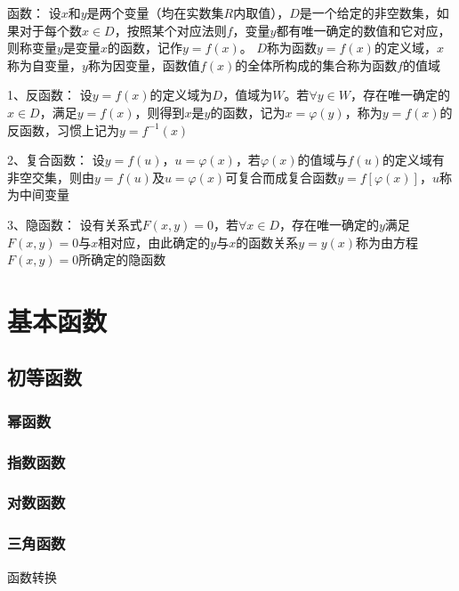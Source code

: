 \documentclass[12pt]{book}
\begin{document}
函数：
设$x$和$y$是两个变量（均在实数集$R$内取值），$D$是一个给定的非空数集，如果对于每个数$x\in D$，按照某个对应法则$f$，变量$y$都有唯一确定的数值和它对应，则称变量$y$是变量$x$的函数，记作$y= f(x)$。
$D$称为函数$y= f(x)$的定义域，$x$称为自变量，$y$称为因变量，函数值$ f(x)$的全体所构成的集合称为函数$f$的值域

1、反函数：
设$y= f(x)$的定义域为$D$，值域为$W$。若$\forall y \in W$，存在唯一确定的$x \in D$，满足$y= f(x)$，则得到$x$是$y$的函数，记为$ x =\varphi(y)$，称为$y= f(x)$的反函数，习惯上记为$ y= f^{-1}(x)$

2、复合函数：
设$ y = f(u)$，$u=\varphi(x)$，若$\varphi(x)$的值域与$f(u)$的定义域有非空交集，则由$ y = f(u)$及$u=\varphi(x)$可复合而成复合函数$ y = f[\varphi(x)]$，$u$称为中间变量

3、隐函数：
设有关系式$ F(x,y)=0$，若$\forall x\in D$，存在唯一确定的$y$满足$F(x,y)= 0$与$x$相对应，由此确定的$y$与$ x $的函数关系$y = y(x)$称为由方程$  F(x,y)= 0  $所确定的隐函数


\section{基本函数}

\subsection{初等函数}





\subsubsection{幂函数}




\subsubsection{指数函数}



\subsubsection{对数函数}



\subsubsection{三角函数}

函数转换
\end{document}
